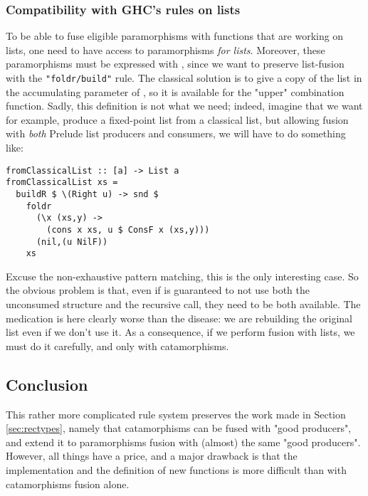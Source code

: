 \subsubsection{Compatibility with GHC's rules on lists}
\label{sec:parabuild}
To be able to fuse eligible paramorphisms with functions that are working on lists, one need to have access to paramorphisms \emph{for lists}. Moreover, these paramorphisms must be expressed with , since we want to preserve list-fusion with the \verb|"foldr/build"| rule. The classical solution is to give a copy of the list in the accumulating parameter of , so it is available for the "upper" combination function. Sadly, this definition is not what we need; indeed, imagine that we want for example, produce a fixed-point list from a classical list, but allowing fusion with \emph{both} Prelude list producers and  consumers, we will have to do something like:
\begin{verbatim}
fromClassicalList :: [a] -> List a
fromClassicalList xs =
  buildR $ \(Right u) -> snd $
    foldr
      (\x (xs,y) ->
        (cons x xs, u $ ConsF x (xs,y)))
      (nil,(u NilF))
    xs
\end{verbatim}
Excuse the non-exhaustive pattern matching, this is the only interesting case. So the obvious problem is that, even if  is guaranteed to not use both the unconsumed structure and the recursive call, they need to be both available. The medication is here clearly worse than the disease: we are rebuilding the original list even if we don't use it. As a consequence, if we perform fusion with lists, we must do it carefully, and only with catamorphisms.

\subsection{Conclusion}
This rather more complicated rule system preserves the work made in Section \ref{sec:rectypes}, namely that catamorphisms can be fused with "good producers", and extend it to paramorphisms fusion with (almost) the same "good producers". However, all things have a price, and a major drawback is that the implementation and the definition of new functions is more difficult than with catamorphisms fusion alone.